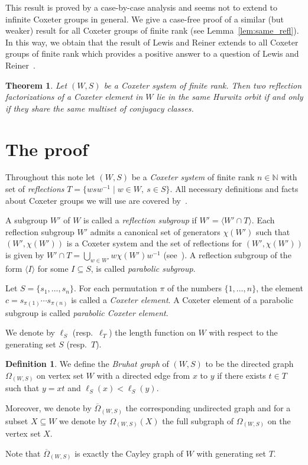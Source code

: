 \documentclass[10pt]{article}
\newtheorem{thm}[theorem]{Theorem}
\theoremstyle{definition}
\newtheorem{defi}[theorem]{Definition}
\providecommand{\resp}{resp.\ }
\begin{document}
This result is proved by a case-by-case analysis and seems not to extend to infinite Coxeter groups in general. We give a case-free proof of a similar (but weaker) result for all Coxeter groups of finite rank (see Lemma~\ref{lem:same_refl}). In this way, we obtain that the result of Lewis and Reiner extends to all Coxeter groups of finite rank which provides a positive answer to a question of Lewis and Reiner~\cite[Question~6.2]{LR16}.

\begin{thm} \label{thm:Main}
Let $(W,S)$ be a Coxeter system of finite rank. Then two reflection factorizations of a Coxeter element in $W$ lie in the same Hurwitz orbit if and only if they share the same multiset of conjugacy classes.
\end{thm}



\section{The proof}
Throughout this note let $(W,S)$ be a \emph{Coxeter system} of finite rank $n \in \mathbb{N}$ with set of \emph{reflections} $T=\{ wsw^{-1} \mid w \in W,~s \in S\}$. All necessary definitions and facts about Coxeter groups we will use are covered by~\cite{BDSW14, Dye90, Dye91, Hu90}.

A subgroup $W'$ of $W$ is called a \emph{reflection subgroup} if $W'= \langle W' \cap T \rangle$. Each reflection subgroup $W'$ admits a canonical set of generators $\chi(W')$ such that $(W', \chi(W'))$ is a Coxeter system and the set of reflections for $(W', \chi(W'))$ is given by $W' \cap T = \bigcup_{w \in W'} w \chi(W') w^{-1}$ (see~\cite[(3.3)~Theorem]{Dye90}). A reflection subgroup of the form $\langle I \rangle$ for some $I \subseteq S$, is called \emph{parabolic subgroup}.

Let $S =\{ s_1, \ldots , s_n \}$. For each permutation $\pi$ of the numbers $\{1, \ldots, n\}$, the element $c= s_{\pi(1)} \cdots s_{\pi(n)}$ is called a \emph{Coxeter element}. A Coxeter element of a parabolic subgroup is called \emph{parabolic Coxeter element}.

We denote by $\ell_S$ (\resp $\ell_T$) the length function on $W$ with respect to the generating set $S$ (\resp $T$).



\begin{defi} \label{def:BruhatGraph}
We define the \emph{Bruhat graph} of $(W,S)$ to be the directed graph $\Omega_{(W,S)}$ on vertex set $W$ with a directed edge from $x$ to $y$ if there exists $t \in T$ such that $y=xt$ and $\ell_S(x) < \ell_S(y)$.

Moreover, we denote by $\overline{\Omega}_{(W,S)}$ the corresponding undirected graph and for a subset $X \subseteq W$ we denote by $\Omega_{(W,S)}(X)$ the full subgraph of $\Omega_{(W,S)}$ on the vertex set $X$.

Note that $\overline{\Omega}_{(W,S)}$ is exactly the Cayley graph of $W$ with generating set $T$. 
\end{defi}
\end{document}
